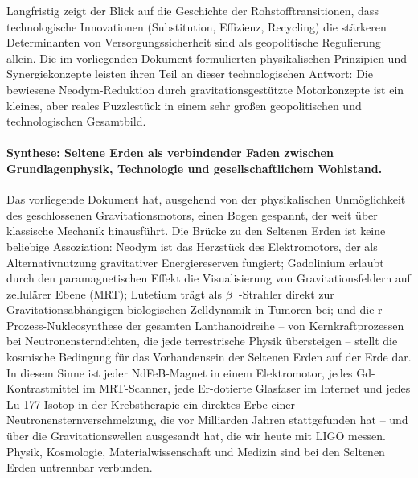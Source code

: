 ﻿\documentclass[12pt, a4paper]{report}
\theoremstyle{definition}
\theoremstyle{remark}
\begin{document}
\noindent Langfristig zeigt der Blick auf die Geschichte der Rohstofftransitionen,
dass technologische Innovationen (Substitution, Effizienz, Recycling) die
stärkeren Determinanten von Versorgungssicherheit sind als geopolitische
Regulierung allein. Die im vorliegenden Dokument formulierten physikalischen
Prinzipien und Synergiekonzepte leisten ihren Teil an dieser technologischen
Antwort: Die bewiesene Neodym-Reduktion durch gravitationsgestützte Motorkonzepte
ist ein kleines, aber reales Puzzlestück in einem sehr großen geopolitischen
und technologischen Gesamtbild.

\paragraph{Synthese: Seltene Erden als verbindender Faden zwischen
Grundlagenphysik, Technologie und gesellschaftlichem Wohlstand.}
Das vorliegende Dokument hat, ausgehend von der physikalischen Unmöglichkeit
des geschlossenen Gravitationsmotors, einen Bogen gespannt, der weit über
klassische Mechanik hinausführt. Die Brücke zu den Seltenen Erden ist keine
beliebige Assoziation: Neodym ist das Herzstück des Elektromotors, der als
Alternativnutzung gravitativer Energiereserven fungiert; Gadolinium erlaubt
durch den paramagnetischen Effekt die Visualisierung von Gravitationsfeldern
auf zellulärer Ebene (MRT); Lutetium trägt als $\beta^-$-Strahler direkt zur
Gravitationsabhängigen biologischen Zelldynamik in Tumoren bei; und die
r-Prozess-Nukleosynthese der gesamten Lanthanoidreihe -- von Kernkraftprozessen
bei Neutronensterndichten, die jede terrestrische Physik übersteigen --
stellt die kosmische Bedingung für das Vorhandensein der Seltenen Erden auf der
Erde dar. In diesem Sinne ist jeder NdFeB-Magnet in einem Elektromotor, jedes
Gd-Kontrastmittel im MRT-Scanner, jede Er-dotierte Glasfaser im Internet
und jedes Lu-177-Isotop in der Krebstherapie ein direktes Erbe einer
Neutronensternverschmelzung, die vor Milliarden Jahren stattgefunden hat --
und über die Gravitationswellen ausgesandt hat, die wir heute mit LIGO messen.
Physik, Kosmologie, Materialwissenschaft und Medizin sind bei den Seltenen
Erden untrennbar verbunden.
\end{document}
